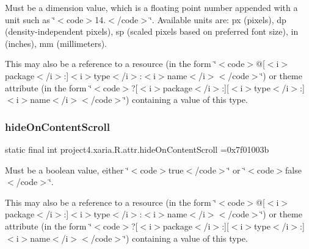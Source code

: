 Must be a dimension value, which is a floating point number appended with a unit such as \char`\"{}$<$code$>$14.\+5sp$<$/code$>$\char`\"{}. Available units are\+: px (pixels), dp (density-\/independent pixels), sp (scaled pixels based on preferred font size), in (inches), mm (millimeters). 

This may also be a reference to a resource (in the form \char`\"{}$<$code$>$@\mbox{[}$<$i$>$package$<$/i$>$\+:\mbox{]}$<$i$>$type$<$/i$>$\+:$<$i$>$name$<$/i$>$$<$/code$>$\char`\"{}) or theme attribute (in the form \char`\"{}$<$code$>$?\mbox{[}$<$i$>$package$<$/i$>$\+:\mbox{]}\mbox{[}$<$i$>$type$<$/i$>$\+:\mbox{]}$<$i$>$name$<$/i$>$$<$/code$>$\char`\"{}) containing a value of this type. \mbox{\label{classproject4_1_1xaria_1_1R_1_1attr_a63ff19873a9c03e1894c323210a00de1}} 
\subsubsection{\texorpdfstring{hide\+On\+Content\+Scroll}{hideOnContentScroll}}
{\footnotesize\ttfamily static final int project4.\+xaria.\+R.\+attr.\+hide\+On\+Content\+Scroll =0x7f01003b\hspace{0.3cm}{\ttfamily [static]}}

Must be a boolean value, either \char`\"{}$<$code$>$true$<$/code$>$\char`\"{} or \char`\"{}$<$code$>$false$<$/code$>$\char`\"{}. 

This may also be a reference to a resource (in the form \char`\"{}$<$code$>$@\mbox{[}$<$i$>$package$<$/i$>$\+:\mbox{]}$<$i$>$type$<$/i$>$\+:$<$i$>$name$<$/i$>$$<$/code$>$\char`\"{}) or theme attribute (in the form \char`\"{}$<$code$>$?\mbox{[}$<$i$>$package$<$/i$>$\+:\mbox{]}\mbox{[}$<$i$>$type$<$/i$>$\+:\mbox{]}$<$i$>$name$<$/i$>$$<$/code$>$\char`\"{}) containing a value of this type. \mbox{\label{classproject4_1_1xaria_1_1R_1_1attr_a3338cb578322be60aa838eabdebc9f71}} 

